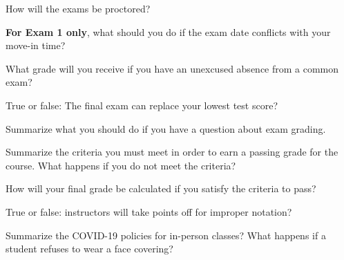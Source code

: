 \documentclass{exam}
\numberwithin{equation}{section} %
\numberwithin{figure}{section} %
\numberwithin{table}{section} %
\begin{document}
\begin{questions}
\newpage

\question How will the exams be proctored?
\begin{solution}[\stretch{1}]

\end{solution}

\question \textbf{For Exam 1 only}, what should you do if the exam date conflicts with your move-in time? 
\begin{solution}[\stretch{1}]

\end{solution}

\question What grade will you receive if you have an unexcused absence from a common exam?
\begin{solution}[\stretch{1}]

\end{solution}

\question True or false: The final exam can replace your lowest test score?
\begin{solution}[\stretch{1}]

\end{solution}

\question Summarize what you should do if you have a question about exam grading. 
\begin{solution}[\stretch{1}]

\end{solution}

\newpage

\question Summarize the criteria you must meet in order to earn a passing grade for the course. What happens if you do not meet the criteria?
\begin{solution}[\stretch{2}]

\end{solution}

\question How will your final grade be calculated if you satisfy the criteria to pass?
\begin{solution}[\stretch{1}]

\end{solution}

\question True or false: instructors will take points off for improper notation?
\begin{solution}[\stretch{1}]

\end{solution}

\newpage

\question Summarize the COVID-19 policies for in-person classes? What happens if a student refuses to wear a face covering?
\begin{solution}[\stretch{2}]


\end{solution}
\end{questions}
\end{document}

